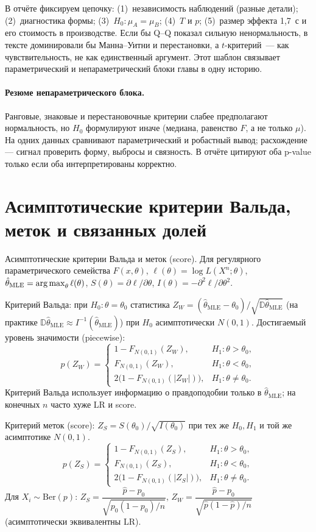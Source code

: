В отчёте фиксируем цепочку: (1)~независимость наблюдений (разные детали); (2)~диагностика формы; (3)~$H_0\colon\mu_A=\mu_B$; (4)~$T$ и $p$; (5)~размер эффекта 1{,}7~с и его стоимость в производстве.
Если бы Q--Q показал сильную ненормальность, в тексте доминировали бы Манна--Уитни и перестановки, а $t$-критерий~--- как чувствительность, не как единственный аргумент. Этот шаблон связывает параметрический и непараметрический блоки главы в одну историю.

\paragraph{Резюме непараметрического блока.}
Ранговые, знаковые и перестановочные критерии слабее предполагают нормальность, но $H_0$ формулируют иначе (медиана, равенство $F$, а не только $\mu$).
На одних данных сравнивают параметрический и робастный вывод; расхождение --- сигнал проверить форму, выбросы и связность.
В отчёте цитируют оба p-value только если оба интерпретированы корректно.

\section{Асимптотические критерии Вальда, меток и связанных долей}
\label{sec:asymptotic-ch2}

Асимптотические критерии Вальда и меток (score). Для регулярного параметрического семейства $F(x,\theta)$, $\ell(\theta)=\log L(X^n;\theta)$, $\hat\theta_{\mathrm{MLE}}=\operatorname*{arg\,max}_\theta\ell(\theta)$, $S(\theta)=\partial\ell/\partial\theta$, $I(\theta)=-\partial^2\ell/\partial\theta^2$.

Критерий Вальда: при $H_0\colon\theta=\theta_0$ статистика $Z_W=(\hat\theta_{\mathrm{MLE}}-\theta_0)/\sqrt{\mathbb{D}\hat\theta_{\mathrm{MLE}}}$ (на практике $\mathbb{D}\hat\theta_{\mathrm{MLE}}\approx I^{-1}(\hat\theta_{\mathrm{MLE}})$) при $H_0$ асимптотически $N(0,1)$.
Достигаемый уровень значимости (piecewise): \[ p(Z_W)=\begin{cases} 1-F_{N(0,1)}(Z_W), & H_1\colon\theta>\theta_0,\\[4pt] F_{N(0,1)}(Z_W), & H_1\colon\theta<\theta_0,\\[4pt] 2\bigl(1-F_{N(0,1)}(|Z_W|)\bigr), & H_1\colon\theta\neq\theta_0.
\end{cases}
\] Критерий Вальда использует информацию о правдоподобии только в $\hat\theta_{\mathrm{MLE}}$; на конечных $n$ часто хуже LR и score.

Критерий меток (score): $Z_S=S(\theta_0)/\sqrt{I(\theta_0)}$ при тех же $H_0,H_1$ и той же асимптотике $N(0,1)$.
\[ p(Z_S)=\begin{cases} 1-F_{N(0,1)}(Z_S), & H_1\colon\theta>\theta_0,\\[4pt] F_{N(0,1)}(Z_S), & H_1\colon\theta<\theta_0,\\[4pt] 2\bigl(1-F_{N(0,1)}(|Z_S|)\bigr), & H_1\colon\theta\neq\theta_0.
\end{cases}
\] Для $X_i\sim\mathrm{Ber}(p)$: $Z_S=\dfrac{\hat p-p_0}{\sqrt{p_0(1-p_0)/n}}$, $Z_W=\dfrac{\hat p-p_0}{\sqrt{\hat p(1-\hat p)/n}}$ (асимптотически эквивалентны LR).

